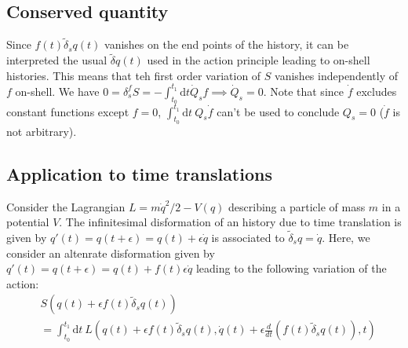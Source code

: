 \documentclass[12pt, a4paper]{article}
\begin{document}
\subsection{Conserved quantity}
Since $f(t)\tilde{\delta}_s q(t)$ vanishes on the end points of the history, it can be interpreted the usual $\tilde{\delta} q(t)$ used in the action principle leading to on-shell histories. This means that teh first order variation of $S$ vanishes independently of $f$ on-shell. We have $0 = \delta_s^f S = -\int_{t_0}^{t_1} \text{d}t \dot{Q}_s f \implies \dot{Q}_s = 0$. Note that since $\dot{f}$ excludes constant functions except $f=0$, $\int_{t_0}^{t_1} \text{d}t \  Q_s \dot{f}$ can't be used to conclude $Q_s = 0$ ($\dot{f}$ is not arbitrary). 
\subsection{Application to time translations}
Consider the Lagrangian $L= m \dot{q}^2/2 - V(q)$ describing a particle of mass $m$ in a potential $V$. The infinitesimal disformation of an history due to time translation is given by $q'(t) = q(t+\epsilon) =  q(t) + \epsilon\dot{q}$ is associated to $\tilde{\delta}_s q = \dot{q}$. Here, we consider an altenrate disformation given by  $q'(t) = q(t+\epsilon) =  q(t) + f(t)\epsilon\dot{q}$ leading to the following variation of the action:
\begin{align*}
    &S(q(t) +\epsilon f(t) \tilde{\delta}_s q(t))\\ &= \int_{t_0}^{t_1} \text{d}t \ L(q(t) +\epsilon f(t) \tilde{\delta}_s q(t), \dot{q}(t) +\epsilon \frac{d}{dt} (f(t) \tilde{\delta}_s q(t)), t)
\end{align*}




\makereferences


\end{document}
